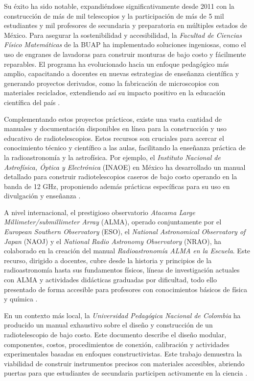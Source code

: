 Su éxito ha sido notable, expandiéndose significativamente desde 2011 con la
construcción de más de mil telescopios y la participación de más de 5 mil
estudiantes y mil profesores de secundaria y preparatoria en múltiples estados
de México.
Para asegurar la sostenibilidad y accesibilidad, la \emph{Facultad de Ciencias
Físico Matemáticas} de la BUAP ha implementado soluciones ingeniosas, como el
uso de engranes de lavadoras para construir monturas de bajo costo y fácilmente
reparables.
El programa ha evolucionado hacia un enfoque pedagógico más amplio, capacitando
a docentes en nuevas estrategias de enseñanza científica y generando proyectos
derivados, como la fabricación de microscopios con materiales reciclados,
extendiendo así su impacto positivo en la educación científica del país
\cite{BoletinesBUAP2021}.

Complementando estos proyectos prácticos, existe una vasta cantidad de manuales
y documentación disponibles en línea para la construcción y uso educativo de
radiotelescopios.
Estos recursos son cruciales para acercar el conocimiento técnico y científico
a las aulas, facilitando la enseñanza práctica de la radioastronomía y la
astrofísica.
Por ejemplo, el \emph{Instituto Nacional de Astrofísica, Óptica y Electrónica}
(INAOE) en México ha desarrollado un manual detallado para construir
radiotelescopios caseros de bajo costo operando en la banda de 12 GHz,
proponiendo además prácticas específicas para su uso en divulgación y enseñanza
\cite{AbrahamLuna2021}.

A nivel internacional, el prestigioso observatorio \emph{Atacama Large
Millimeter/submillimeter Array} (ALMA), operado conjuntamente por el
\emph{European Southern Observatory} (ESO), el \emph{National Astronomical
Observatory of Japan} (NAOJ) y el \emph{National Radio Astronomy Observatory}
(NRAO), ha colaborado en la creación del manual \emph{Radioastronomía ALMA en la
Escuela}.
Este recurso, dirigido a docentes, cubre desde la historia y principios de la
radioastronomía hasta sus fundamentos físicos, líneas de investigación actuales
con ALMA y actividades didácticas graduadas por dificultad, todo ello
presentado de forma accesible para profesores con conocimientos básicos de
física y química \cite{Gallardo2021}.

En un contexto más local, la \emph{Universidad Pedagógica Nacional de Colombia}
ha producido un manual exhaustivo sobre el diseño y construcción de un
radiotelescopio de bajo costo.
Este documento describe el diseño modular, componentes, costos, procedimientos
de conexión, calibración y actividades experimentales basadas en enfoques
constructivistas.
Este trabajo demuestra la viabilidad de construir instrumentos precisos con
materiales accesibles, abriendo puertas para que estudiantes de secundaria
participen activamente en la ciencia \cite{Penaloza2023}.

